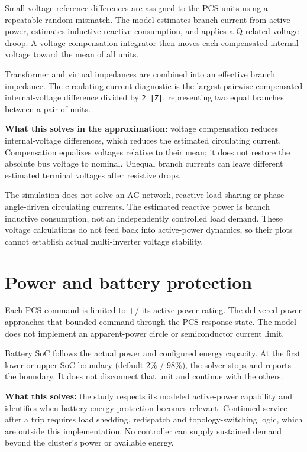 \documentclass[11pt,a4paper]{article}
\begin{document}
Small voltage-reference differences are assigned to the PCS units using a repeatable random mismatch. The model estimates branch current from active power, estimates inductive reactive consumption, and applies a Q-related voltage droop. A voltage-compensation integrator then moves each compensated internal voltage toward the mean of all units.

Transformer and virtual impedances are combined into an effective branch impedance. The circulating-current diagnostic is the largest pairwise compensated internal-voltage difference divided by \texttt{2 |Z|}, representing two equal branches between a pair of units.

\textbf{What this solves in the approximation:} voltage compensation reduces internal-voltage differences, which reduces the estimated circulating current. Compensation equalizes voltages relative to their mean; it does not restore the absolute bus voltage to nominal. Unequal branch currents can leave different estimated terminal voltages after resistive drops.

The simulation does not solve an AC network, reactive-load sharing or phase-angle-driven circulating currents. The estimated reactive power is branch inductive consumption, not an independently controlled load demand. These voltage calculations do not feed back into active-power dynamics, so their plots cannot establish actual multi-inverter voltage stability.

\section{Power and battery protection}

Each PCS command is limited to +/-its active-power rating. The delivered power approaches that bounded command through the PCS response state. The model does not implement an apparent-power circle or semiconductor current limit.

Battery SoC follows the actual power and configured energy capacity. At the first lower or upper SoC boundary (default 2\% / 98\%), the solver stops and reports the boundary. It does not disconnect that unit and continue with the others.

\textbf{What this solves:} the study respects its modeled active-power capability and identifies when battery energy protection becomes relevant. Continued service after a trip requires load shedding, redispatch and topology-switching logic, which are outside this implementation. No controller can supply sustained demand beyond the cluster's power or available energy.
\end{document}
